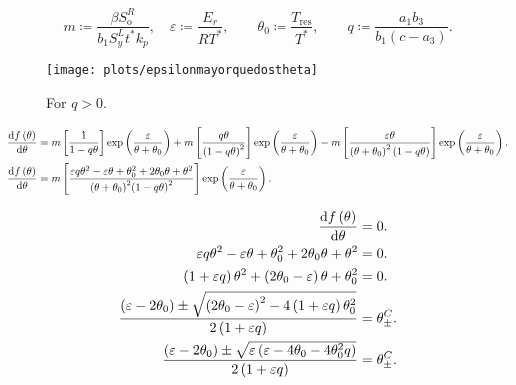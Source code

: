 \documentclass[
    8pt,
    aspectratio=1610,
    c,
    intlimits,
    leqno,
    professionalfonts,
]{beamer}
\begin{document}
\begin{frame}
	\begin{equation*}
		m\coloneqq
		\frac{\beta S^{R}_{\text{o}}}{b_{1}S^{L}_{y}t^{\ast}k_{p}},\quad
		\varepsilon\coloneqq \frac{E_{r}}{RT^{\ast}},\qquad
		\theta_{0}\coloneqq \frac{T_{\text{res}}}{T^{\ast}},\qquad
		q\coloneqq \frac{a_{1}b_{3}}{b_{1}\left(c-a_{3}\right)}.
	\end{equation*}
\end{frame}

\begin{frame}
\begin{figure}[ht!]
	\centering
	\texttt{[image: plots/epsilonmayorquedostheta]}
	\caption{For $q>0$.}
\end{figure}
\end{frame}

\begin{frame}
	\begin{align*}
		\diff{f\left(\theta\right)}{\theta} & =
		m\left[\frac{1}{1-q\theta}\right]
		\exp\left(\frac{\varepsilon}{\theta+\theta_{0}}\right)+
		m\left[\frac{q\theta}{\left(1-q\theta\right)^{2}}\right]
		\exp\left(\frac{\varepsilon}{\theta+\theta_{0}}\right)-
		m\left[\frac{\varepsilon\theta}{{\left(\theta+\theta_{0}\right)}^{2}\left(1-q\theta\right)}\right]
		\exp\left(\frac{\varepsilon}{\theta+\theta_{0}}\right). \\
		\diff{f\left(\theta\right)}{\theta} & =
		m\left[
			\frac{
				\varepsilon q\theta^{2}-
				\varepsilon\theta+
				\theta_{0}^{2}+
				2\theta_{0}\theta+
				\theta^{2}
			}{
				{\left(\theta+\theta_{0}\right)}^{2}
					{\left(1-q\theta\right)}^{2}
			}
			\right]
		\exp\left(\frac{\varepsilon}{\theta+\theta_{0}}\right).
	\end{align*}

	\begin{align*}
		\diff{f\left(\theta\right)}{\theta} & =
		0.                                      \\
		\varepsilon q\theta^{2}-
		\varepsilon\theta+
		\theta_{0}^{2}+
		2\theta_{0}\theta+
		\theta^{2}                          & =
		0.                                      \\
		\left(1+\varepsilon q\right)
		\theta^{2}+
		\left(2\theta_{0}-\varepsilon\right)\theta+
		\theta_{0}^{2}                      & =
		0.                                      \\
		\frac{
			\left(\varepsilon-2\theta_{0}\right)\pm
			\sqrt{{\left(2\theta_{0}-\varepsilon\right)}^{2}-4\left(1+\varepsilon q\right)\theta_{0}^{2}}
		}{
			2\left(1+\varepsilon q\right)
		}
		                                    & =
		\theta^{C}_{\pm}.                       \\
		\frac{
			\left(\varepsilon-2\theta_{0}\right)\pm
			\sqrt{\varepsilon\left(\varepsilon-4\theta_{0}-4\theta_{0}^{2}q\right)}
		}{
			2\left(1+\varepsilon q\right)
		}
		                                    & =
		\theta^{C}_{\pm}.
	\end{align*}


\end{frame}
\end{document}
